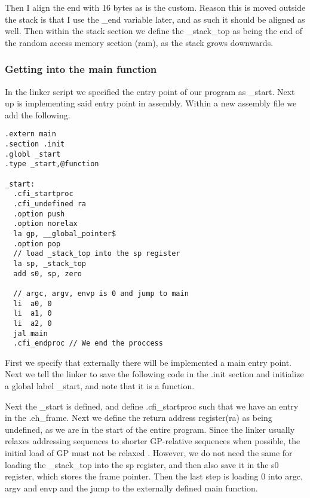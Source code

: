 Then I align the end with 16 bytes as is the custom. Reason this is moved outside the stack
is that I use the \_end variable later, and as such it should be aligned as well.
Then within the stack section we define the \_stack\_top as being the end of the random access
memory section (ram), as the stack grows downwards.

\subsubsection{Getting into the main function}
In the linker script we specified the entry point of our program as \_start. Next up
is implementing said entry point in assembly. Within a new assembly file we add the following.
\begin{lstlisting}
.extern main
.section .init
.globl _start
.type _start,@function

_start:
  .cfi_startproc
  .cfi_undefined ra
  .option push
  .option norelax
  la gp, __global_pointer$
  .option pop
  // load _stack_top into the sp register
  la sp, _stack_top
  add s0, sp, zero

  // argc, argv, envp is 0 and jump to main
  li  a0, 0
  li  a1, 0
  li  a2, 0
  jal main
  .cfi_endproc // We end the proccess
\end{lstlisting}
First we specify that externally there will be implemented a main entry point. Next we tell the
linker to save the following code in the .init section and initialize a global label \_start,
and note that it is a function.

Next the \_start is defined, and define .cfi\_startproc such that we have an entry in the
.eh\_frame. Next we define the return address register(ra) as being undefined, as we are in
the start of the entire program. Since the linker usually relaxes addressing sequences to
shorter GP-relative sequences when possible, the initial load of GP must not be relaxed
\cite{GNU_BIN}. However, we do not need the same for loading the \_stack\_top into the sp
register, and then also save it in the s0 register, which stores the frame pointer.
Then the last step is loading 0 into argc, argv and envp and the jump to the externally
defined main function.

